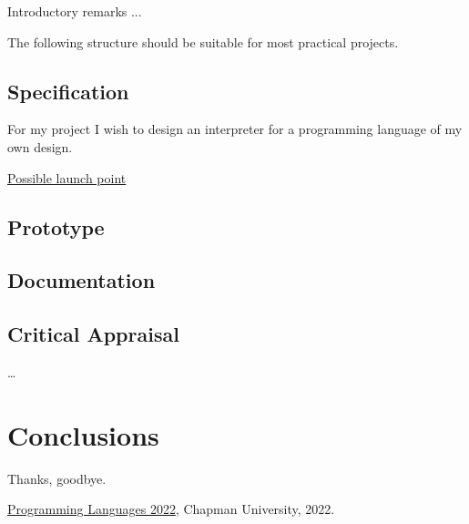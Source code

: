 \documentclass{article}
\theoremstyle{theorem}
\theoremstyle{definition}
\theoremstyle{remark}
\begin{document}
Introductory remarks ...

The following structure should be suitable for most practical projects. 

\subsection{Specification}

For my project I wish to design an interpreter for a programming language of my own design.



\href{https://www.stephendiehl.com/llvm/}{Possible launch point}

\subsection{Prototype}
\subsection{Documentation}
\subsection{Critical Appraisal}

\ldots

\section{Conclusions}\label{conclusions}


Thanks, goodbye.

\begin{thebibliography}{99}
 \href{https://github.com/alexhkurz/programming-languages-2022/blob/main/README.md}{Programming Languages 2022}, Chapman University, 2022.
\end{thebibliography}

\end{document}
